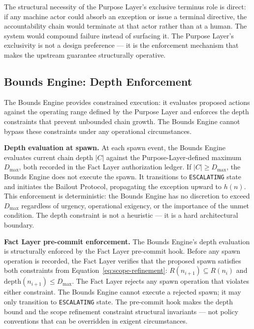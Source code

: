 \medskip
The structural necessity of the Purpose Layer's exclusive terminus role is direct: if any machine actor could absorb an exception or issue a terminal directive, the accountability chain would terminate at that actor rather than at a human. The system would compound failure instead of surfacing it. The Purpose Layer's exclusivity is not a design preference — it is the enforcement mechanism that makes the upstream guarantee structurally operative.

\subsection{Bounds Engine: Depth Enforcement}
\label{sec:rs-bounds-depth}

The Bounds Engine provides constrained execution: it evaluates proposed actions against the operating range defined by the Purpose Layer and enforces the depth constraints that prevent unbounded chain growth. The Bounds Engine cannot bypass these constraints under any operational circumstances.

\medskip
\noindent\textbf{Depth evaluation at spawn.} At each spawn event, the Bounds Engine evaluates current chain depth $|C|$ against the Purpose-Layer-defined maximum $D_{\text{max}}$, both recorded in the Fact Layer authorization ledger. If $|C| \geq D_{\text{max}}$, the Bounds Engine does not execute the spawn. It transitions to \texttt{ESCALATING} state and initiates the Bailout Protocol, propagating the exception upward to $h(n)$. This enforcement is deterministic: the Bounds Engine has no discretion to exceed $D_{\text{max}}$ regardless of urgency, operational exigency, or the importance of the unmet condition. The depth constraint is not a heuristic — it is a hard architectural boundary.

\medskip
\noindent\textbf{Fact Layer pre-commit enforcement.} The Bounds Engine's depth evaluation is structurally enforced by the Fact Layer pre-commit hook. Before any spawn operation is recorded, the Fact Layer verifies that the proposed spawn satisfies both constraints from Equation~\ref{eq:scope-refinement}: $R(n_{i+1}) \subseteq R(n_i)$ and $\text{depth}(n_{i+1}) \leq D_{\text{max}}$. The Fact Layer rejects any spawn operation that violates either constraint. The Bounds Engine cannot execute a rejected spawn; it may only transition to \texttt{ESCALATING} state. The pre-commit hook makes the depth bound and the scope refinement constraint structural invariants — not policy conventions that can be overridden in exigent circumstances.

